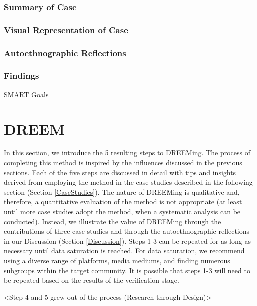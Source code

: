 \subsubsection{Summary of Case}

\subsubsection{Visual Representation of Case}

\subsubsection{Autoethnographic Reflections}

\subsubsection{Findings}
SMART Goals

\section{DREEM} \label{DREEM}
In this section, we introduce the 5 resulting steps to DREEMing. The process of completing this method is inspired by the influences discussed in the previous sections. Each of the five steps are discussed in detail with tips and insights derived from employing the method in the case studies described in the following section (Section \ref{CaseStudies}). The nature of DREEMing is qualitative and, therefore, a quantitative evaluation of the method is not appropriate (at least until more case studies adopt the method, when a systematic analysis can be conducted). Instead, we illustrate the value of DREEMing through the contributions of {\color{red}three} case studies and through the autoethnographic reflections \cite{ramboAutoethnography2020} in our Discussion (Section \ref{Discussion}). Steps 1-3 can be repeated for as long as necessary until data saturation is reached. For data saturation, we recommend using a diverse range of platforms, media mediums, and finding numerous subgroups within the target community.  It is possible that steps 1-3 will need to be repeated based on the results of the verification stage. 

<Step 4 and 5 grew out of the process (Research through Design)>


